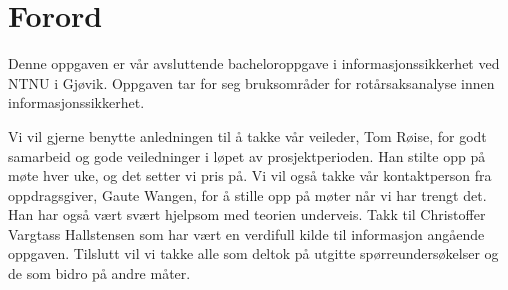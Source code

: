 \chapter*{Forord} %
\label{kap:forord}

Denne oppgaven er vår avsluttende bacheloroppgave i informasjonssikkerhet ved NTNU i Gjøvik. Oppgaven tar for seg bruksområder for rotårsaksanalyse innen informasjonssikkerhet. 

Vi vil gjerne benytte anledningen til å takke vår veileder, Tom Røise, for godt samarbeid og gode veiledninger i løpet av prosjektperioden. Han stilte opp på møte hver uke, og det setter vi pris på. Vi vil også takke vår kontaktperson fra oppdragsgiver, Gaute Wangen, for å stille opp på møter når vi har trengt det. Han har også vært svært hjelpsom med teorien underveis. Takk til Christoffer Vargtass Hallstensen som har vært en verdifull kilde til informasjon angående oppgaven. Tilslutt vil vi takke alle som deltok på utgitte spørreundersøkelser og de som bidro på andre måter. 